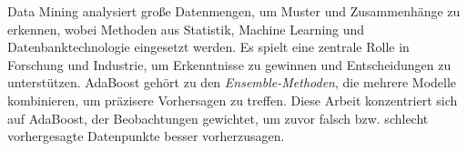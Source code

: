 Data Mining analysiert große Datenmengen, um Muster und Zusammenhänge zu erkennen,
wobei Methoden aus Statistik, Machine Learning und Datenbanktechnologie eingesetzt werden.
Es spielt eine zentrale Rolle in Forschung und Industrie, um Erkenntnisse zu gewinnen und
Entscheidungen zu unterstützen. AdaBoost gehört zu den
\emph{Ensemble-Methoden}, die mehrere Modelle kombinieren, um präzisere Vorhersagen zu treffen.
Diese Arbeit konzentriert sich auf AdaBoost, der Beobachtungen gewichtet, um zuvor falsch bzw. schlecht vorhergesagte
Datenpunkte besser vorherzusagen.